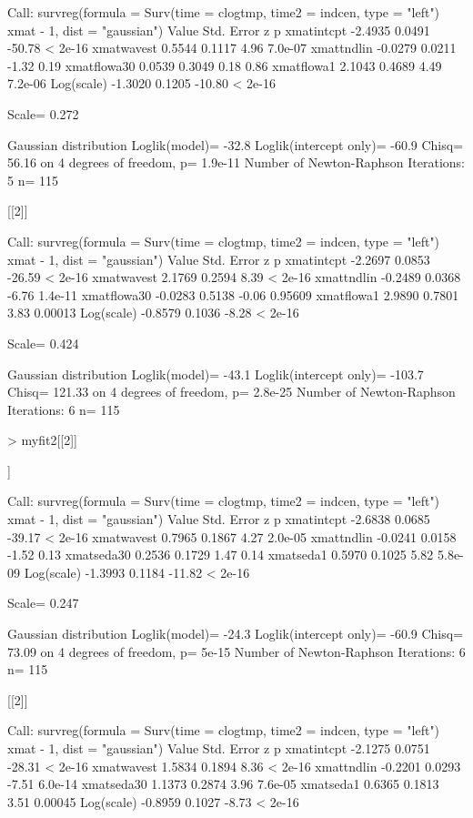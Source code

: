 \documentclass[11pt]{article}
\begin{document}
\begin{Schunk}
\begin{Soutput}
Call:
survreg(formula = Surv(time = clogtmp, time2 = indcen, type = "left") ~ 
    xmat - 1, dist = "gaussian")
              Value Std. Error      z       p
xmatintcpt  -2.4935     0.0491 -50.78 < 2e-16
xmatwavest   0.5544     0.1117   4.96 7.0e-07
xmattndlin  -0.0279     0.0211  -1.32    0.19
xmatflowa30  0.0539     0.3049   0.18    0.86
xmatflowa1   2.1043     0.4689   4.49 7.2e-06
Log(scale)  -1.3020     0.1205 -10.80 < 2e-16

Scale= 0.272 

Gaussian distribution
Loglik(model)= -32.8   Loglik(intercept only)= -60.9
	Chisq= 56.16 on 4 degrees of freedom, p= 1.9e-11 
Number of Newton-Raphson Iterations: 5 
n= 115 


[[2]]

Call:
survreg(formula = Surv(time = clogtmp, time2 = indcen, type = "left") ~ 
    xmat - 1, dist = "gaussian")
              Value Std. Error      z       p
xmatintcpt  -2.2697     0.0853 -26.59 < 2e-16
xmatwavest   2.1769     0.2594   8.39 < 2e-16
xmattndlin  -0.2489     0.0368  -6.76 1.4e-11
xmatflowa30 -0.0283     0.5138  -0.06 0.95609
xmatflowa1   2.9890     0.7801   3.83 0.00013
Log(scale)  -0.8579     0.1036  -8.28 < 2e-16

Scale= 0.424 

Gaussian distribution
Loglik(model)= -43.1   Loglik(intercept only)= -103.7
	Chisq= 121.33 on 4 degrees of freedom, p= 2.8e-25 
Number of Newton-Raphson Iterations: 6 
n= 115 
\end{Soutput}
\begin{Sinput}
> myfit2[[2]]
\end{Sinput}
\begin{Soutput}
[[1]]

Call:
survreg(formula = Surv(time = clogtmp, time2 = indcen, type = "left") ~ 
    xmat - 1, dist = "gaussian")
             Value Std. Error      z       p
xmatintcpt -2.6838     0.0685 -39.17 < 2e-16
xmatwavest  0.7965     0.1867   4.27 2.0e-05
xmattndlin -0.0241     0.0158  -1.52    0.13
xmatseda30  0.2536     0.1729   1.47    0.14
xmatseda1   0.5970     0.1025   5.82 5.8e-09
Log(scale) -1.3993     0.1184 -11.82 < 2e-16

Scale= 0.247 

Gaussian distribution
Loglik(model)= -24.3   Loglik(intercept only)= -60.9
	Chisq= 73.09 on 4 degrees of freedom, p= 5e-15 
Number of Newton-Raphson Iterations: 6 
n= 115 


[[2]]

Call:
survreg(formula = Surv(time = clogtmp, time2 = indcen, type = "left") ~ 
    xmat - 1, dist = "gaussian")
             Value Std. Error      z       p
xmatintcpt -2.1275     0.0751 -28.31 < 2e-16
xmatwavest  1.5834     0.1894   8.36 < 2e-16
xmattndlin -0.2201     0.0293  -7.51 6.0e-14
xmatseda30  1.1373     0.2874   3.96 7.6e-05
xmatseda1   0.6365     0.1813   3.51 0.00045
Log(scale) -0.8959     0.1027  -8.73 < 2e-16


\end{Soutput}
\end{Schunk}
\end{document}

